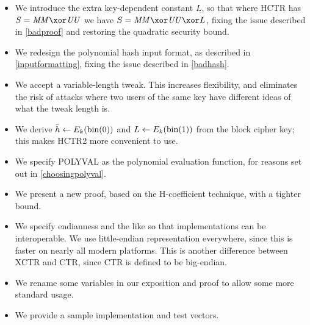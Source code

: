 \documentclass[hctr2.tex]{subfiles}
\begin{document}
\begin{itemize}
    \item We introduce the extra
    key-dependent constant \(L\),
    so that where HCTR has \(S = \MM \xor \UU\)
    we have \(S = \MM \xor \UU \xor L\),
    fixing the issue described in \autoref{badproof}
    and restoring the quadratic security bound.
    \item We redesign the polynomial hash input format, as described in
    \autoref{inputformatting}, fixing the issue described in \autoref{badhash}.
    \item We accept a variable-length tweak.
    This increases flexibility,
    and eliminates the risk of attacks where
    two users of the same key have different ideas
    of what the tweak length is.
    \item We derive \(\bar{h} \gets E_k(\operatorname{bin}(0))\)
    and \(L \gets E_k(\operatorname{bin}(1))\) from the block cipher key;
    this makes HCTR2 more convenient to use.
    \item We specify POLYVAL\cite{aes_gcm_siv,aes_gcm_siv_rfc}
    as the polynomial evaluation function,
    for reasons set out in \autoref{choosingpolyval}.
    \item We present a new proof, based on the H-coefficient technique,
    with a tighter bound.
    \item We specify endianness and the like so that implementations can be interoperable. We use little-endian representation everywhere,
    since this is faster on nearly all modern platforms.
    This is another difference between XCTR and CTR, since
    CTR is defined to be big-endian.
    \item We rename some variables in our exposition and proof to allow some more standard usage.
    \item We provide a sample implementation and test vectors.
\end{itemize}
\end{document}
